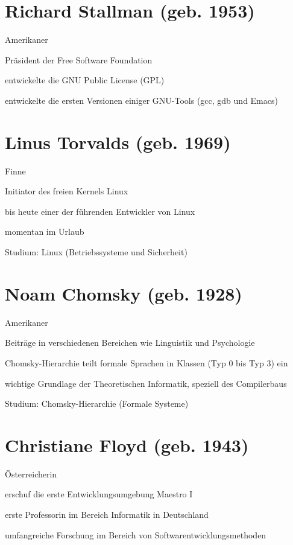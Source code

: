 \documentclass[a4paper,12pt]{report}
\begin{document}
\section*{Richard Stallman (geb. 1953)}
\begin{itemize*}
    \item Amerikaner
    \item Präsident der Free Software Foundation
    \item entwickelte die GNU Public License (GPL)
    \item entwickelte die ersten Versionen einiger GNU-Tools (gcc, gdb und Emacs)
\end{itemize*}

\section*{Linus Torvalds (geb. 1969)}
\begin{itemize*}
    \item Finne
    \item Initiator des freien Kernels Linux
    \item bis heute einer der führenden Entwickler von Linux
    \item momentan im Urlaub
    \item Studium: Linux (Betriebssysteme und Sicherheit)
\end{itemize*}

\section*{Noam Chomsky (geb. 1928)}
\begin{itemize*}
    \item Amerikaner
    \item Beiträge in verschiedenen Bereichen wie Linguistik und Psychologie
    \item Chomsky-Hierarchie teilt formale Sprachen in Klassen (Typ 0 bis Typ 3) ein
    \item wichtige Grundlage der Theoretischen Informatik, speziell des Compilerbaus
    \item Studium: Chomsky-Hierarchie (Formale Systeme)
\end{itemize*}

\newpage

\section*{Christiane Floyd (geb. 1943)}
\begin{itemize*}
    \item Österreicherin
    \item erschuf die erste Entwicklungsumgebung Maestro I
    \item erste Professorin im Bereich Informatik in Deutschland
    \item umfangreiche Forschung im Bereich von Softwarentwicklungsmethoden
\end{itemize*}
\end{document}
